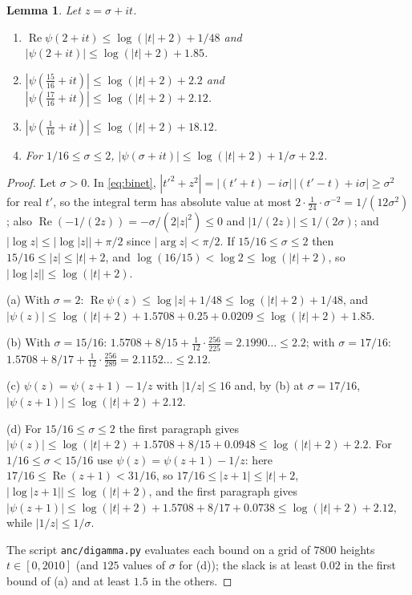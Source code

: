 \documentclass[11pt]{article}
\newtheorem{lemma}{Lemma}[section]
\theoremstyle{definition}
\theoremstyle{remark}
\numberwithin{equation}{section}
\newcommand{\Rea}{\operatorname{Re}}
\begin{document}
\begin{lemma}\label{lem:digamma}
Let $z=\sigma+it$.
\begin{enumerate}
\item[\textup{(a)}] $\Rea\psi(2+it)\le\log(|t|+2)+1/48$ and $|\psi(2+it)|\le\log(|t|+2)+1.85$.
\item[\textup{(b)}] $|\psi(\tfrac{15}{16}+it)|\le\log(|t|+2)+2.2$ and $|\psi(\tfrac{17}{16}+it)|\le\log(|t|+2)+2.12$.
\item[\textup{(c)}] $|\psi(\tfrac1{16}+it)|\le\log(|t|+2)+18.12$.
\item[\textup{(d)}] For $1/16\le\sigma\le2$, $|\psi(\sigma+it)|\le\log(|t|+2)+1/\sigma+2.2$.
\end{enumerate}
\end{lemma}

\begin{proof}
Let $\sigma>0$. In \eqref{eq:binet}, $|t'^2+z^2|=|(t'+t)-i\sigma|\,|(t'-t)+i\sigma|\ge\sigma^2$ for real $t'$, so the integral term has absolute value at most $2\cdot\frac1{24}\cdot\sigma^{-2}=1/(12\sigma^2)$; also $\Rea(-1/(2z))=-\sigma/(2|z|^2)\le0$ and $|1/(2z)|\le1/(2\sigma)$; and $|\log z|\le|\log|z||+\pi/2$ since $|\arg z|<\pi/2$. If $15/16\le\sigma\le2$ then $15/16\le|z|\le|t|+2$, and $\log(16/15)<\log2\le\log(|t|+2)$, so $|\log|z||\le\log(|t|+2)$.

(a) With $\sigma=2$: $\Rea\psi(z)\le\log|z|+1/48\le\log(|t|+2)+1/48$, and $|\psi(z)|\le\log(|t|+2)+1.5708+0.25+0.0209\le\log(|t|+2)+1.85$.

(b) With $\sigma=15/16$: $1.5708+8/15+\frac1{12}\cdot\frac{256}{225}=2.1990\ldots\le2.2$; with $\sigma=17/16$: $1.5708+8/17+\frac1{12}\cdot\frac{256}{289}=2.1152\ldots\le2.12$.

(c) $\psi(z)=\psi(z+1)-1/z$ with $|1/z|\le16$ and, by (b) at $\sigma=17/16$, $|\psi(z+1)|\le\log(|t|+2)+2.12$.

(d) For $15/16\le\sigma\le2$ the first paragraph gives $|\psi(z)|\le\log(|t|+2)+1.5708+8/15+0.0948\le\log(|t|+2)+2.2$. For $1/16\le\sigma<15/16$ use $\psi(z)=\psi(z+1)-1/z$: here $17/16\le\Rea(z+1)<31/16$, so $17/16\le|z+1|\le|t|+2$, $|\log|z+1||\le\log(|t|+2)$, and the first paragraph gives $|\psi(z+1)|\le\log(|t|+2)+1.5708+8/17+0.0738\le\log(|t|+2)+2.12$, while $|1/z|\le1/\sigma$.

The script \texttt{anc/digamma.py} evaluates each bound on a grid of $7800$ heights $t\in[0,2010]$ (and $125$ values of $\sigma$ for (d)); the slack is at least $0.02$ in the first bound of (a) and at least $1.5$ in the others.
\end{proof}
\end{document}
